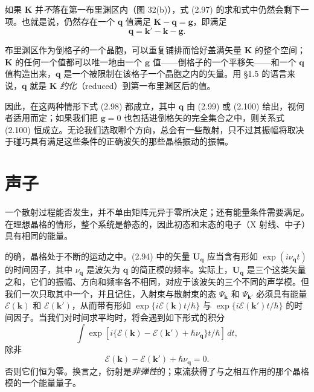 如果 $\mathbf{K}$ 并\emph{不}落在第一布里渊区内（图 32(b)），式 (2.97)
的求和式中仍然会剩下一项。也就是说，仍然存在一个 $\mathbf{q}$
值满足 $\mathbf{K} - \mathbf{q} = \mathbf{g}$，即满足
\begin{equation*}
\mathbf{q} = \mathbf{k}' - \mathbf{k} - \mathbf{g}.
\tag{2.100}
\end{equation*}

布里渊区作为倒格子的一个晶胞，可以重复铺排而恰好盖满矢量 $\mathbf{K}$ 的整个空间；$\mathbf{K}$ 的任何一个值都可以唯一地由一个 $\mathbf{g}$ 值——倒格子的一个平移矢——和一个 $\mathbf{q}$ 值构造出来，$\mathbf{q}$ 是一个被限制在该格子一个晶胞之内的矢量。用 §1.5 的语言来说，$\mathbf{q}$ 就是 $\mathbf{K}$ \emph{约化}（reduced）到第一布里渊区后的值。

因此，在这两种情形下式 (2.98) 都成立，其中 $\mathbf{q}$ 由 (2.99) 或 (2.100) 给出，视何者适用而定；如果我们把 $\mathbf{g}=0$ 也包括进倒格矢的完全集合之中，则关系式 (2.100) 恒成立。无论我们选取哪个方向，总会有一些散射，只不过其振幅将取决于碰巧具有满足这些条件的正确波矢的那些晶格振动的振幅。

\section{声子}

一个散射过程能否发生，并不单由矩阵元异于零所决定；还有能量条件需要满足。在理想晶格的情形，整个系统是静态的，因此初态和末态的电子（X 射线、中子）具有相同的能量。

的确，晶格处于不断的运动之中。(2.94) 中的矢量 $\mathbf{U}_{\mathbf{q}}$ 应当含有形如 $\exp(i\nu_{\mathbf{q}}t)$ 的时间因子，其中 $\nu_{\mathbf{q}}$ 是波矢为 $\mathbf{q}$ 的简正模的频率。实际上，$\mathbf{U}_{\mathbf{q}}$ 是三个这类矢量之和，它们的振幅、方向和频率各不相同，对应于该波矢的三个不同的声学模。但我们一次只取其中一个，并且记住，入射束与散射束的态 $\Psi_{\mathbf{k}}$ 和 $\Psi_{\mathbf{k}'}$ 必须具有能量 $\mathcal{E}(\mathbf{k})$ 和 $\mathcal{E}(\mathbf{k}')$，从而带有形如 $\exp\{i\mathcal{E}(\mathbf{k})t/\hbar\}$ 与 $\exp\{i\mathcal{E}(\mathbf{k}')t/\hbar\}$ 的时间因子。当我们对时间求平均时，将会遇到如下形式的积分
\begin{equation*}
\int \exp[i\{\mathcal{E}(\mathbf{k})-\mathcal{E}(\mathbf{k}')+\hbar\nu_{\mathbf{q}}\}t/\hbar]\,dt,
\end{equation*}
除非
\begin{equation*}
\mathcal{E}(\mathbf{k})-\mathcal{E}(\mathbf{k}')+\hbar\nu_{\mathbf{q}}=0.
\tag{2.101}
\end{equation*}
否则它们恒为零。换言之，衍射是\emph{非弹性}的；束流获得了与之相互作用的那个晶格模的一个能量量子。

